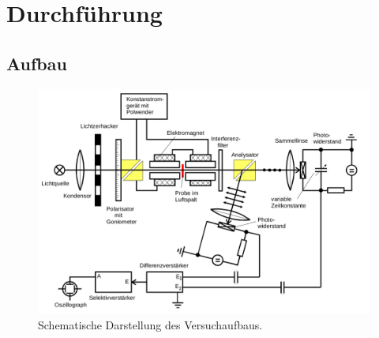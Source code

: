 \section{Durchführung}
\label{sec:Durchführung}

\subsection{Aufbau}
\begin{figure}
    \centering
    \includegraphics[width=.9\textwidth]{Bilder/Aufbau.png}
    \caption{Schematische Darstellung des Versuchaufbaus. \cite{V46}}
    \label{fig:aufbau}
\end{figure}


